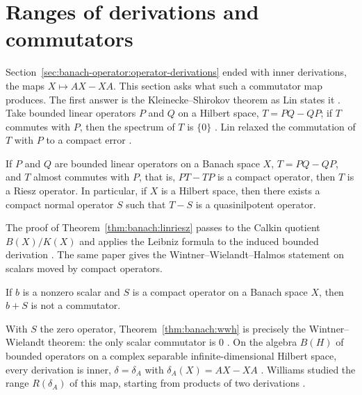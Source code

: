 \section{Ranges of derivations and commutators}\label{sec:banach-operator:commutator-ranges}

Section~\ref{sec:banach-operator:operator-derivations} ended with inner
derivations, the maps $X\mapsto AX-XA$. This section asks what such a
commutator map produces. The first answer is the Kleinecke--Shirokov
theorem as Lin states it \cite[p.~529]{LinCS1971Kleinecke}. Take bounded
linear operators $P$ and $Q$ on a Hilbert space, $T=PQ-QP$; if $T$ commutes
with $P$, then the spectrum of $T$ is $\{0\}$
\cite[p.~529]{LinCS1971Kleinecke}. Lin relaxed the commutation of $T$
with $P$ to a compact error \cite[Theorem~1, p.~529]{LinCS1971Kleinecke}.

\begin{theorem}\label{thm:banach:linriesz}
If $P$ and $Q$ are bounded linear operators on a Banach space $X$,
$T=PQ-QP$, and $T$ almost commutes with $P$, that is, $PT-TP$ is a compact
operator, then $T$ is a Riesz operator. In particular, if $X$ is a Hilbert
space, then there exists a compact normal operator $S$ such that $T-S$ is
a quasinilpotent operator.
\end{theorem}

The proof of Theorem~\ref{thm:banach:linriesz} passes to the Calkin
quotient $B(X)/K(X)$ and applies the Leibniz formula to the induced
bounded derivation \cite[p.~529]{LinCS1971Kleinecke}. The same paper gives
the Wintner--Wielandt--Halmos statement on scalars moved by compact
operators.

\begin{theorem}\label{thm:banach:wwh}
If $b$ is a nonzero scalar and $S$ is a compact operator on a Banach space
$X$, then $b+S$ is not a commutator.
\end{theorem}

With $S$ the zero operator, Theorem~\ref{thm:banach:wwh} is precisely the
Wintner--Wielandt theorem: the only scalar commutator is $0$
\cite[p.~530]{LinCS1971Kleinecke}. On the algebra $B(H)$ of bounded
operators on a complex separable infinite-dimensional Hilbert space, every
derivation is inner, $\delta=\delta_A$ with $\delta_A(X)=AX-XA$
\cite[p.~273]{WilliamsJP1971Range}. Williams studied the range
$R(\delta_A)$ of this map, starting from products of two derivations
\cite[Theorem~1, pp.~273--274]{WilliamsJP1971Range}.

